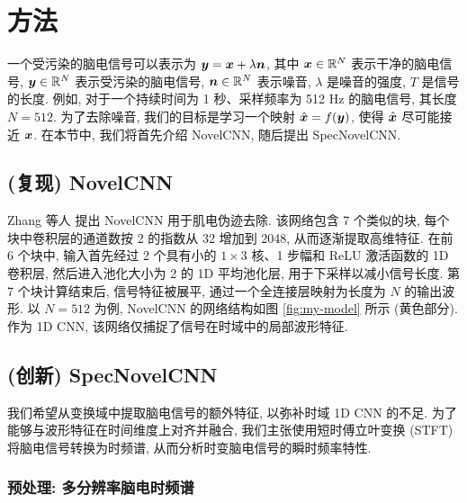 \documentclass[12pt,a4paper]{article}
\begin{document}
\section{方法}

一个受污染的脑电信号可以表示为 ${\bm{y}} = {\bm{x}} + \lambda {\bm{n}}$, 其中 ${\bm{x}} \in \mathbb{R}^N$ 表示干净的脑电信号, ${\bm{y}} \in \mathbb{R}^N$ 表示受污染的脑电信号, ${\bm{n}} \in \mathbb{R}^N$ 表示噪音, $\lambda$ 是噪音的强度, $T$ 是信号的长度. 例如, 对于一个持续时间为 1 秒、采样频率为 512 Hz 的脑电信号, 其长度 $N = 512$. 为了去除噪音, 我们的目标是学习一个映射 $\hat{{\bm{x}}} = f({\bm{y}})$, 使得 $\hat{{\bm{x}}}$ 尽可能接近 ${\bm{x}}$. 在本节中, 我们将首先介绍 NovelCNN, 随后提出 SpecNovelCNN.

\subsection{(复现) NovelCNN}

Zhang 等人 \cite{zhang_novel_2021} 提出 NovelCNN 用于肌电伪迹去除. 该网络包含 7 个类似的块, 每个块中卷积层的通道数按 2 的指数从 32 增加到 2048, 从而逐渐提取高维特征. 在前 6 个块中, 输入首先经过 2 个具有小的 $1\times 3$ 核、1 步幅和 ReLU 激活函数的 1D 卷积层, 然后进入池化大小为 2 的 1D 平均池化层, 用于下采样以减小信号长度. 第 7 个块计算结束后, 信号特征被展平, 通过一个全连接层映射为长度为 $N$ 的输出波形. 以 $N=512$ 为例, NovelCNN 的网络结构如图 \ref{fig:my-model} 所示 (黄色部分). 作为 1D CNN, 该网络仅捕捉了信号在时域中的局部波形特征.

\subsection{(创新) SpecNovelCNN}

我们希望从变换域中提取脑电信号的额外特征, 以弥补时域 1D CNN 的不足. 为了能够与波形特征在时间维度上对齐并融合, 我们主张使用短时傅立叶变换 (STFT) 将脑电信号转换为时频谱, 从而分析时变脑电信号的瞬时频率特性.

\subsubsection{预处理: 多分辨率脑电时频谱}
\end{document}
